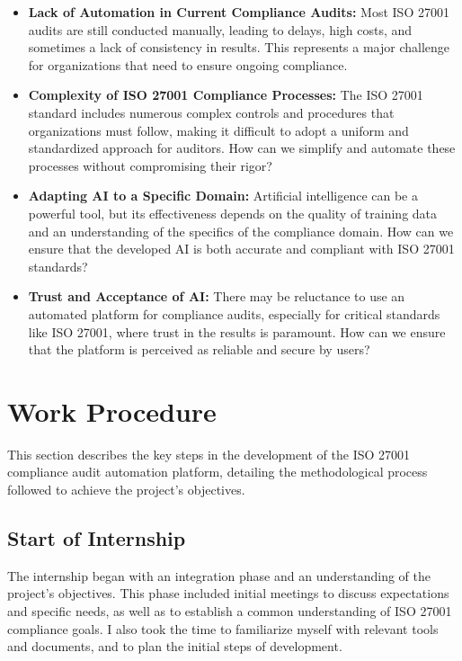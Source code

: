 \begin{itemize}
    \item \textbf{Lack of Automation in Current Compliance Audits:} Most ISO 27001 audits are still conducted manually, leading to delays, high costs, and sometimes a lack of consistency in results. This represents a major challenge for organizations that need to ensure ongoing compliance.
    
    \item \textbf{Complexity of ISO 27001 Compliance Processes:} The ISO 27001 standard includes numerous complex controls and procedures that organizations must follow, making it difficult to adopt a uniform and standardized approach for auditors. How can we simplify and automate these processes without compromising their rigor?
    
    \item \textbf{Adapting AI to a Specific Domain:} Artificial intelligence can be a powerful tool, but its effectiveness depends on the quality of training data and an understanding of the specifics of the compliance domain. How can we ensure that the developed AI is both accurate and compliant with ISO 27001 standards?
    
    \item \textbf{Trust and Acceptance of AI:} There may be reluctance to use an automated platform for compliance audits, especially for critical standards like ISO 27001, where trust in the results is paramount. How can we ensure that the platform is perceived as reliable and secure by users?
\end{itemize}

\section{Work Procedure}

This section describes the key steps in the development of the ISO 27001 compliance audit automation platform, detailing the methodological process followed to achieve the project's objectives.

\subsection{Start of Internship}
The internship began with an integration phase and an understanding of the project's objectives. This phase included initial meetings to discuss expectations and specific needs, as well as to establish a common understanding of ISO 27001 compliance goals. I also took the time to familiarize myself with relevant tools and documents, and to plan the initial steps of development.

